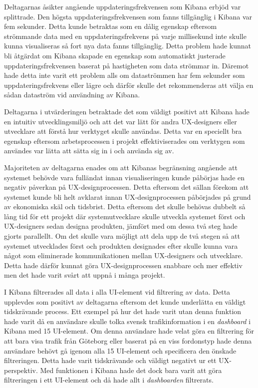 \documentclass[12pt]{kththesis}
\begin{document}
Deltagarnas åsikter angående uppdateringsfrekvensen som Kibana erbjöd var splittrade. Den högsta uppdateringsfrekvensen som fanns tillgänglig i Kibana var fem sekunder. Detta kunde betraktas som en dålig egenskap eftersom strömmande data med en uppdateringsfrekvens på varje millisekund inte skulle kunna visualiseras så fort nya data fanns tillgänglig. Detta problem hade kunnat bli åtgärdat om Kibana skapade en egenskap som automatiskt justerade uppdateringsfrekvensen baserat på hastigheten som data strömmar in. Däremot hade detta inte varit ett problem alls om dataströmmen har fem sekunder som uppdateringsfrekvens eller lägre och därför skulle det rekommenderas att välja en sådan dataström vid användning av Kibana. 

Deltagarna i utvärderingen betraktade det som väldigt positivt att Kibana hade en intuitiv utvecklingsmiljö och att det var lätt för andra UX-designers eller utvecklare att förstå hur verktyget skulle användas. Detta var en speciellt bra egenskap eftersom arbetsprocessen i projekt effektiviserades om verktygen som användes var lätta att sätta sig in i och använda sig av. 

Majoriteten av deltagarna enades om att Kibanas begränsning angående att systemet behövde vara fulländat innan visualiseringen kunde påbörjas hade en negativ påverkan på UX-designprocessen. Detta eftersom det sällan förekom att systemet kunde bli helt avklarat innan UX-designprocessen påbörjades på grund av ekonomiska skäl och tidsbrist. Detta eftersom det skulle behövas dubbelt så lång tid för ett projekt där systemutvecklare skulle utveckla systemet först och UX-designers sedan designa produkten, jämfört med om dessa två steg hade gjorts parallellt. Om det skulle vara möjligt att dela upp de två stegen så att systemet utvecklades först och produkten designades efter skulle kunna vara något som eliminerade kommunikationen mellan UX-designers och utvecklare. Detta hade därför kunnat göra UX-designprocessen snabbare och mer effektiv men det hade varit svårt att uppnå i många projekt.

I Kibana filtrerades all data i alla UI-element vid filtrering av data. Detta upplevdes som positivt av deltagarna eftersom det kunde underlätta en väldigt tidskrävande process. Ett exempel på hur det hade varit utan denna funktion hade varit då en användare skulle tolka svensk trafikinformation i en \textit{dashboard} i Kibana med 15 UI-element. Om denna användare hade velat göra en filtrering för att bara visa trafik från Göteborg eller baserat på en viss fordonstyp hade denna användare behövt gå igenom alla 15 UI-element och specificera den önskade filtreringen. Detta hade varit tidskrävande och väldigt negativt ur ett UX-perspektiv. Med funktionen i Kibana hade det dock bara varit att göra filtreringen i ett UI-element och då hade allt i \textit{dashboarden} filtrerats. 
\end{document}
